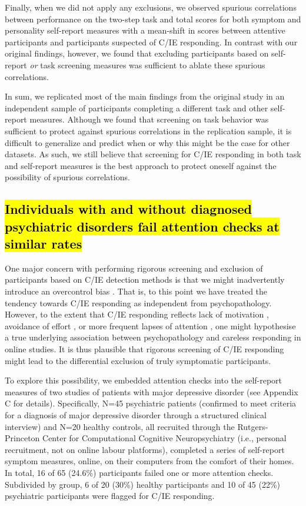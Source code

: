 \documentclass[a4paper,notitlepage,12pt]{article}
\begin{document}
\begin{refsection}[main]
Finally, when we did not apply any exclusions, we observed spurious correlations between performance on the two-step task and total scores for both symptom and personality self-report measures with a mean-shift in scores between attentive participants and participants suspected of C/IE responding. In contrast with our original findings, however, we found that excluding participants based on self-report \textit{or} task screening measures was sufficient to ablate these spurious correlations. 

In sum, we replicated most of the main findings from the original study in an independent sample of participants completing a different task and other self-report measures. Although we found that screening on task behavior was sufficient to protect against spurious correlations in the replication sample, it is difficult to generalize and predict when or why this might be the case for other datasets. As such, we still believe that screening for C/IE responding in both task and self-report measures is the best approach to protect oneself against the possibility of spurious correlations.

\subsection{\texorpdfstring{\hl{Individuals with and without diagnosed psychiatric disorders fail attention checks at similar rates}}{}}

One major concern with performing rigorous screening and exclusion of participants based on C/IE detection methods is that we might inadvertently introduce an overcontrol bias \cite{elwert2014endogenous}. That is, to this point we have treated the tendency towards C/IE responding as independent from psychopathology. However, to the extent that C/IE responding reflects lack of motivation \cite{barch2015mechanisms}, avoidance of effort \cite{cohen2001impairments, culbreth2016negative}, or more frequent lapses of attention \cite{kane2016individual, robison2017neurotic}, one might hypothesise a true underlying association between psychopathology and careless responding in online studies. It is thus plausible that rigorous screening of C/IE responding might lead to the differential exclusion of truly symptomatic participants. 

To explore this possibility, we embedded attention checks into the self-report measures of two studies of patients with major depressive disorder (see Appendix C for details). Specifically, N=45 psychiatric patients (confirmed to meet criteria for a diagnosis of major depressive disorder through a structured clinical interview) and N=20 healthy controls, all recruited through the Rutgers-Princeton Center for Computational Cognitive Neuropsychiatry (i.e., personal recruitment, not on online labour platforms), completed a series of self-report symptom measures, online, on their computers from the comfort of their homes. In total, 16 of 65 (24.6\%) participants failed one or more attention checks. Subdivided by group, 6 of 20 (30\%) healthy participants and 10 of 45 (22\%) psychiatric participants were flagged for C/IE responding.


\end{refsection}
\end{document}

